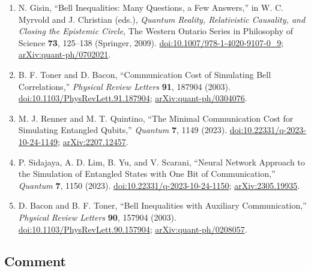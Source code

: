 \begin{enumerate}[label={},leftmargin=4.8em,labelsep=0.5em]
  \footnotesize
  \item[\textup{[Gis09]}]\label{ref:p27-gisin}
  N. Gisin, ``Bell Inequalities: Many Questions, a Few Answers,'' in
  W. C. Myrvold and J. Christian (eds.), \emph{Quantum Reality, Relativistic
  Causality, and Closing the Epistemic Circle}, The Western Ontario Series in
  Philosophy of Science \textbf{73}, 125--138 (Springer, 2009).
  \href{https://doi.org/10.1007/978-1-4020-9107-0_9}{doi:10.1007/978-1-4020-9107-0\_9};
  \href{https://arxiv.org/abs/quant-ph/0702021}{arXiv:quant-ph/0702021}.

  \item[\textup{[TB03]}]\label{ref:p27-toner-bacon}
  B. F. Toner and D. Bacon, ``Communication Cost of Simulating Bell
  Correlations,'' \emph{Physical Review Letters} \textbf{91}, 187904 (2003).
  \href{https://doi.org/10.1103/PhysRevLett.91.187904}{doi:10.1103/PhysRevLett.91.187904};
  \href{https://arxiv.org/abs/quant-ph/0304076}{arXiv:quant-ph/0304076}.

  \item[\textup{[RQ23]}]\label{ref:p27-renner-quintino}
  M. J. Renner and M. T. Quintino, ``The Minimal Communication Cost for
  Simulating Entangled Qubits,'' \emph{Quantum} \textbf{7}, 1149 (2023).
  \href{https://doi.org/10.22331/q-2023-10-24-1149}{doi:10.22331/q-2023-10-24-1149};
  \href{https://arxiv.org/abs/2207.12457}{arXiv:2207.12457}.

  \item[\textup{[SLYS23]}]\label{ref:p27-sidajaya}
  P. Sidajaya, A. D. Lim, B. Yu, and V. Scarani, ``Neural Network Approach to
  the Simulation of Entangled States with One Bit of Communication,''
  \emph{Quantum} \textbf{7}, 1150 (2023).
  \href{https://doi.org/10.22331/q-2023-10-24-1150}{doi:10.22331/q-2023-10-24-1150};
  \href{https://arxiv.org/abs/2305.19935}{arXiv:2305.19935}.

  \item[\textup{[BT03]}]\label{ref:p27-bacon-toner}
  D. Bacon and B. F. Toner, ``Bell Inequalities with Auxiliary
  Communication,'' \emph{Physical Review Letters} \textbf{90}, 157904
  (2003). \href{https://doi.org/10.1103/PhysRevLett.90.157904}{doi:10.1103/PhysRevLett.90.157904};
  \href{https://arxiv.org/abs/quant-ph/0208057}{arXiv:quant-ph/0208057}.
\end{enumerate}

\subsection*{Comment}

